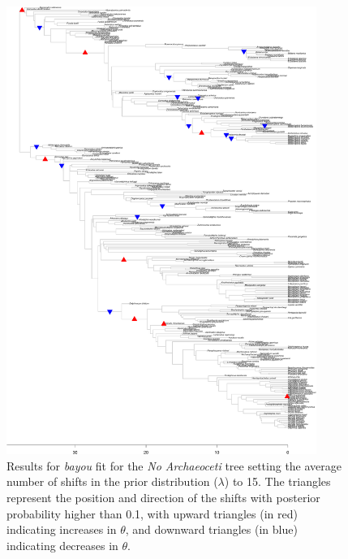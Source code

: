 \begin{figure}[H]
\includegraphics[width=0.9\textwidth]{img/plots-noarchaeo-wZBL-k15-1.pdf}
\caption{Results for \textit{bayou} fit for the \textit{No Archaeoceti} tree setting the average number of shifts in the prior distribution ($\lambda$) to 15. The triangles represent the position and direction of the shifts with posterior probability higher than 0.1, with upward triangles (in red) indicating increases in $\theta$, and downward triangles (in blue) indicating decreases in $\theta$.}
\label{fig:noarchaeo-k15}
\end{figure}

\newpage

